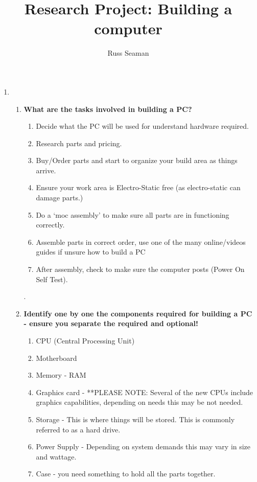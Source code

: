 \documentclass[]{article}
\title{Research Project: Building a computer}
\author{Russ Seaman}
\begin{document}
\maketitle

\begin{enumerate}
	\item

\begin{enumerate}
	\item \textbf{What are the tasks involved in building a PC?}
				\smallskip
				\\ \begin{enumerate}
					\item Decide what the PC will be used for understand hardware required.
					\item Research parts and pricing.
					\item Buy/Order parts and start to organize your build area as things arrive.
					\item Ensure your work area is Electro-Static free (as electro-static can damage parts.)
					\item Do a `moc assembly' to make sure all parts are in functioning correctly.
					\item Assemble parts in correct order, use one of the many online/videos guides if unsure how to build a PC
					\item After assembly, check to make sure the computer posts (Power On Self Test).

				\end{enumerate}.
				\medskip
	\item \textbf{Identify one by one the components required for building a PC - ensure you separate the required and optional!}
				\smallskip
				\begin{enumerate}
						\item CPU (Central Processing Unit)
						\item Motherboard
						\item Memory - RAM
						\item Graphics card - **PLEASE NOTE: Several of the new CPUs include graphics capabilities, depending on needs this may be not needed.
						\item Storage - This is where things will be stored.  This is commonly referred to as a hard drive.
						\item Power Supply - Depending on system demands this may vary in size and wattage.
						\item Case - you need something to hold all the parts together.
				\end{enumerate}
				\medskip


\end{enumerate}
\end{enumerate}
\end{document}
